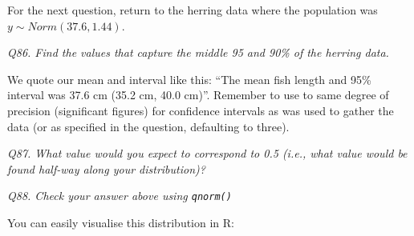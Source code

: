\documentclass[
  11pt,
  a4paper,
]{book}
\begin{document}
For the next question, return to the herring data where the population was \(y \sim Norm(37.6, 1.44)\).

\emph{Q86. Find the values that capture the middle 95 and 90\% of the herring data.}

We quote our mean and interval like this: ``The mean fish length and 95\% interval was 37.6 cm (35.2 cm, 40.0 cm)''. Remember to use to same degree of precision (significant figures) for confidence intervals as was used to gather the data (or as specified in the question, defaulting to three).

\emph{Q87. What value would you expect to correspond to 0.5 (i.e., what value would be found half-way along your distribution)?}

\emph{Q88. Check your answer above using \texttt{qnorm()}}

You can easily visualise this distribution in R:
\end{document}
